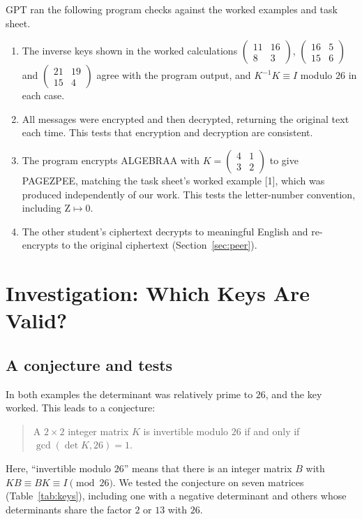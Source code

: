 \documentclass[11pt,a4paper]{article}
\newcommand{\smat}[1]{\left(\begin{smallmatrix}#1\end{smallmatrix}\right)}
\theoremstyle{plain}
\theoremstyle{definition}
\begin{document}
GPT ran the following program checks against the worked examples and task sheet.
\begin{enumerate}
\item The inverse keys shown in the worked calculations $\smat{11&16\\8&3}$, $\smat{16&5\\15&6}$ and $\smat{21&19\\15&4}$ agree with the program output, and $K^{-1}K\equiv I$ modulo $26$ in each case.
\item All messages were encrypted and then decrypted, returning the original text each time. This tests that encryption and decryption are consistent.
\item The program encrypts ALGEBRAA with $K=\smat{4&1\\3&2}$ to give PAGEZPEE, matching the task sheet's worked example [1], which was produced independently of our work. This tests the letter-number convention, including $\text{Z}\mapsto0$.
\item The other student's ciphertext decrypts to meaningful English and re-encrypts to the original ciphertext (Section~\ref{sec:peer}).
\end{enumerate}


\section{Investigation: Which Keys Are Valid?}\label{sec:valid}

\subsection{A conjecture and tests}

In both examples the determinant was relatively prime to $26$, and the key worked. This leads to a conjecture:

\begin{quote}
A $2\times2$ integer matrix $K$ is invertible modulo $26$ if and only if $\gcd(\det K,26)=1$.
\end{quote}

Here, ``invertible modulo $26$'' means that there is an integer matrix $B$ with $KB\equiv BK\equiv I\pmod{26}$. We tested the conjecture on seven matrices (Table~\ref{tab:keys}), including one with a negative determinant and others whose determinants share the factor $2$ or $13$ with $26$.
\end{document}
